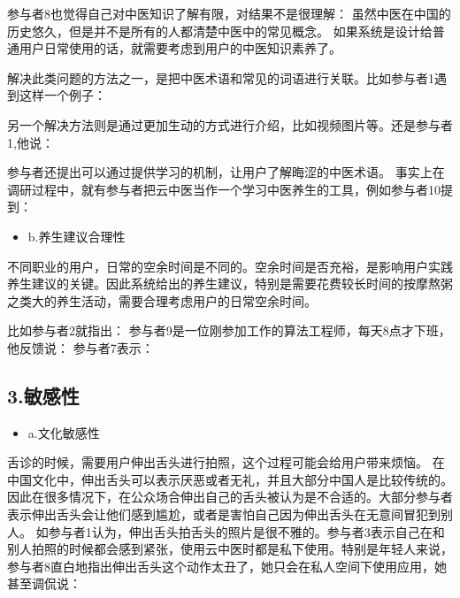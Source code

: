 参与者8也觉得自己对中医知识了解有限，对结果不是很理解：
虽然中医在中国的历史悠久，但是并不是所有的人都清楚中医中的常见概念。 如果系统是设计给普通用户日常使用的话，就需要考虑到用户的中医知识素养了。

解决此类问题的方法之一，是把中医术语和常见的词语进行关联。比如参与者1遇到这样一个例子：

另一个解决方法则是通过更加生动的方式进行介绍，比如视频图片等。还是参与者1,他说：

参与者还提出可以通过提供学习的机制，让用户了解晦涩的中医术语。
事实上在调研过程中，就有参与者把云中医当作一个学习中医养生的工具，例如参与者10提到：

\begin{itemize}
\item b.养生建议合理性
\end{itemize}

不同职业的用户，日常的空余时间是不同的。空余时间是否充裕，是影响用户实践养生建议的关键。因此系统给出的养生建议，特别是需要花费较长时间的按摩熬粥之类大的养生活动，需要合理考虑用户的日常空余时间。

比如参与者2就指出：
参与者9是一位刚参加工作的算法工程师，每天8点才下班，他反馈说： 参与者7表示：

\subsection{3.敏感性}

\begin{itemize}
\item a.文化敏感性
\end{itemize}


舌诊的时候，需要用户伸出舌头进行拍照，这个过程可能会给用户带来烦恼。
在中国文化中，伸出舌头可以表示厌恶或者无礼，并且大部分中国人是比较传统的。因此在很多情况下，在公众场合伸出自己的舌头被认为是不合适的。大部分参与者表示伸出舌头会让他们感到尴尬，或者是害怕自己因为伸出舌头在无意间冒犯到别人。
如参与者1认为，伸出舌头拍舌头的照片是很不雅的。参与者3表示自己在和别人拍照的时候都会感到紧张，使用云中医时都是私下使用。特别是年轻人来说，参与者8直白地指出伸出舌头这个动作太丑了，她只会在私人空间下使用应用，她甚至调侃说：

